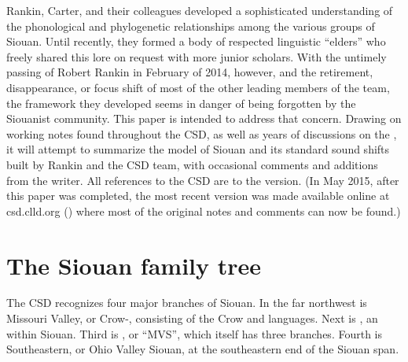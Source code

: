 \documentclass[output=paper]{LSP/langsci}
\begin{document}
Rankin, Carter, and their colleagues developed a sophisticated understanding of the phonological and phylogenetic relationships among the various groups of Siouan.  Until recently, they formed a body of respected linguistic ``elders'' who freely shared this lore on request with more junior scholars.  With the untimely passing of Robert Rankin in February of 2014, however, and the retirement, disappearance, or focus shift of most of the other leading members of the team, the framework they developed seems in danger of being forgotten by the Siouanist community.  This paper is intended to address that concern.  Drawing on working notes found throughout the CSD, as well as years of discussions on the , it will attempt to summarize the model of Siouan  and its standard sound shifts built by Rankin and the CSD team, with occasional comments and additions from the writer.  All references to the CSD are to the \citeyear{Rankinetal2006PDF} version. (In May 2015, after this paper was completed, the most recent version was made available online at csd.clld.org (\citealt{Rankinetal2015AccessMay}) where most of the original notes and comments can now be found.)


\section{The Siouan family tree}

The CSD recognizes four major branches of Siouan. In the far northwest is Missouri Valley, or Crow-, consisting of the Crow and  languages. Next is , an  within Siouan. Third is , or ``MVS'', which itself has three branches. Fourth is Southeastern, or Ohio Valley Siouan, at the southeastern end of the Siouan span.
\end{document}
